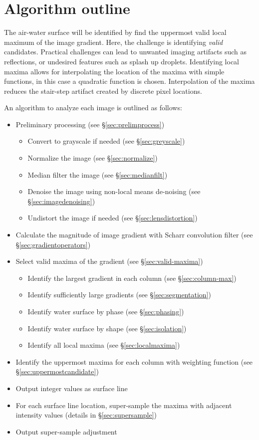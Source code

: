 \section{Algorithm outline}
\par
The air-water surface will be identified by find the uppermost valid local maximum of the image gradient.
Here, the challenge is identifying {\em valid} candidates.
Practical challenges can lead to unwanted imaging artifacts such as reflections, or undesired features such as splash up droplets.
Identifying local maxima allows for interpolating the location of the maxima with simple functions, in this case a quadratic function is chosen.
Interpolation of the maxima reduces the stair-step artifact created by discrete pixel locations.
\par
An algorithm to analyze each image is outlined as follows:
%
\begin{itemize}
	\item Preliminary processing (see \S \ref{sec:prelimprocess})
	\begin{itemize}
		\item Convert to grayscale if needed (see \S \ref{sec:greyscale})
		\item Normalize the image (see \S \ref{sec:normalize})
		\item Median filter the image (see \S \ref{sec:medianfilt})
		\item Denoise the image using non-local means de-noising (see \S \ref{sec:imagedenoising})
		\item Undistort the image if needed (see \S \ref{sec:lensdistortion})
	\end{itemize}
	\item Calculate the magnitude of image gradient with Scharr convolution filter (see \S \ref{sec:gradientoperators})
	\item Select valid maxima of the gradient (see \S \ref{sec:valid-maxima})
	\begin{itemize}
		\item Identify the largest gradient in each column (see \S \ref{sec:column-max})
		\item Identify sufficiently large gradients (see \S \ref{sec:segmentation})
		\item Identify water surface by phase (see \S \ref{sec:phasing})
		\item Identify water surface by shape (see \S \ref{sec:isolation})
		\item Identify all local maxima (see \S \ref{sec:localmaxima})
	\end{itemize}
	\item Identify the uppermost maxima for each column with weighting function (see \S \ref{sec:uppermostcandidate})
	\item Output integer values as surface line
	\item For each surface line location, super-sample the maxima with adjacent intensity values (details in \S \ref{sec:supersample})
	\item Output super-sample adjustment
\end{itemize}
